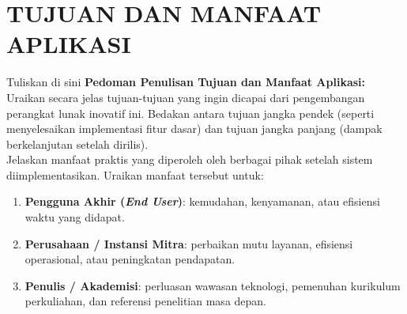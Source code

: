 \chapter{TUJUAN DAN MANFAAT APLIKASI}


Tuliskan di sini \textbf{Pedoman Penulisan Tujuan dan Manfaat Aplikasi:} \\
Uraikan secara jelas tujuan-tujuan yang ingin dicapai dari pengembangan perangkat lunak inovatif ini. Bedakan antara tujuan jangka pendek (seperti menyelesaikan implementasi fitur dasar) dan tujuan jangka panjang (dampak berkelanjutan setelah dirilis).\\
Jelaskan manfaat praktis yang diperoleh oleh berbagai pihak setelah sistem diimplementasikan. Uraikan manfaat tersebut untuk:
\begin{enumerate}
    \item \textbf{Pengguna Akhir (\textit{End User})}: kemudahan, kenyamanan, atau efisiensi waktu yang didapat.
    \item \textbf{Perusahaan / Instansi Mitra}: perbaikan mutu layanan, efisiensi operasional, atau peningkatan pendapatan.
    \item \textbf{Penulis / Akademisi}: perluasan wawasan teknologi, pemenuhan kurikulum perkuliahan, dan referensi penelitian masa depan.
\end{enumerate}

